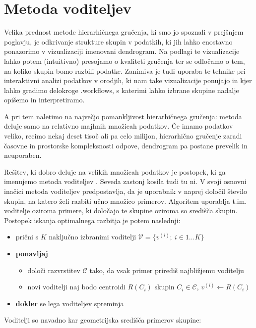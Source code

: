 \chapter{Metoda voditeljev}

Velika prednost metode hierarhičnega gručenja, ki smo jo spoznali v prejšnjem poglavju, je odkrivanje strukture skupin v podatkih, ki jih lahko enostavno ponazorimo v vizualizaciji imenovani dendrogram. Na podlagi te vizualizacije lahko potem (intuitivno) presojamo o kvaliteti gručenja ter se odločamo o tem, na koliko skupin bomo razbili podatke. Zanimiva je tudi uporaba te tehnike pri interaktivni analizi podatkov v orodjih, ki nam take vizualizacije ponujajo in kjer lahko gradimo delokroge \angl.{workflows}, s katerimi lahko izbrane skupine nadalje opišemo in interpretiramo.

A pri tem naletimo na največjo pomankljivost hierarhičnega gručenja: metoda deluje samo na relativno majhnih množicah podatkov. Če imamo podatkov veliko, recimo nekaj deset tisoč ali pa celo milijon, hierarhično gručenje zaradi časovne in prostorske kompleksnosti odpove, dendrogram pa postane prevelik in neuporaben.

Rešitev, ki dobro deluje na velikih množicah podatkov je postopek, ki ga imenujemo metoda voditeljev . Seveda zastonj kosila tudi tu ni. V svoji
osnovni inačici metoda voditeljev predpostavlja, da je uporabnik v naprej določil število skupin,
na katero želi razbiti učno množico primerov. Algoritem uporablja
t.im. voditelje oziroma primere, ki določajo te skupine oziroma so
središča skupin. Postopek iskanja optimalnega razbitja je potem
naslednji:

\begin{itemize}
\item prični s $K$ naključno izbranimi voditelji $\mathcal{V}=\{v^{(i)};\ i\in{1\ldots K}\}$
\item {\bf ponavljaj}
\begin{itemize}
  \item določi razvrstitev $\mathcal{C}$ tako, da vsak primer prirediš
    najbližjemu voditelju
  \item novi voditelji naj bodo centroidi $R(C_i)$ skupin $C_i\in\mathcal{C}$, $v^{(i)}\leftarrow R(C_i)$
\end{itemize}
\item {\bf dokler} se lega voditeljev spreminja
\end{itemize}

Voditelji  so navadno kar geometrijska središča primerov skupine:

